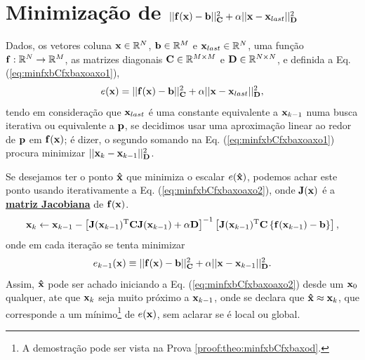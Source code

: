 \section{Minimização de $||\VECTOR{f}(\VECTOR{x})-\VECTOR{b}||_{\MATRIX{C}}^2+\alpha||\VECTOR{x}-\VECTOR{x}_{last}||_{\MATRIX{D}}^2$}



\begin{theorem}\label{theo:minfxbCfxbaxoaxo}
Dados,
os vetores coluna $\VECTOR{x}\in \mathbb{R}^N$, $\VECTOR{b}\in \mathbb{R}^M$ e $\VECTOR{x}_{last}\in \mathbb{R}^N$,  
uma função $\VECTOR{f}:\mathbb{R}^{N} \rightarrow \mathbb{R}^{M}$, 
as matrizes diagonais $\MATRIX{C} \in \mathbb{R}^{M\times M}$ e $\MATRIX{D} \in \mathbb{R}^{N\times N}$, e 
definida a Eq. (\ref{eq:minfxbCfxbaxoaxo1}),
\begin{equation}\label{eq:minfxbCfxbaxoaxo1}
e(\VECTOR{x})=||\VECTOR{f}(\VECTOR{x})-\VECTOR{b}||_{\MATRIX{C}}^2+\alpha||\VECTOR{x}-\VECTOR{x}_{last}||_{\MATRIX{D}}^2,
\end{equation}
tendo em consideração que $\VECTOR{x}_{last}$ é uma constante equivalente a $\VECTOR{x}_{k-1}$
numa busca iterativa ou equivalente a $\VECTOR{p}$, 
se decidimos usar uma aproximação linear ao redor de $\VECTOR{p}$ em $\VECTOR{f}(\VECTOR{x})$; 
é dizer, o segundo somando na Eq. (\ref{eq:minfxbCfxbaxoaxo1}) 
procura minimizar $||\VECTOR{x}_{k}-\VECTOR{x}_{k-1}||_{\MATRIX{D}}^2$.


Se desejamos ter o ponto $\VECTOR{\hat{x}}$ que minimiza o escalar $e(\VECTOR{\hat{x}})$,
podemos achar este ponto usando iterativamente a Eq. (\ref{eq:minfxbCfxbaxoaxo2}),
onde  $\MATRIX{J}(\VECTOR{x})$ é a \hyperref[def:jacobian]{\textbf{matriz Jacobiana}}  de $\VECTOR{f}(\VECTOR{x})$.
\begin{equation}\label{eq:minfxbCfxbaxoaxo2}
\VECTOR{x}_{k}\leftarrow \VECTOR{x}_{k-1}-
\left[ \MATRIX{J}(\VECTOR{x}_{k-1})^{\transpose}\MATRIX{C} \MATRIX{J}(\VECTOR{x}_{k-1}) +\alpha\MATRIX{D} \right]^{-1}
 \left[\MATRIX{J}(\VECTOR{x}_{k-1})^{\transpose}\MATRIX{C}\left\{\VECTOR{f}(\VECTOR{x}_{k-1})-\VECTOR{b}\right\}\right],
\end{equation}
onde em cada iteração se tenta minimizar
\begin{equation}\label{eq:minfxbCfxbaxoaxo2:ex}
e_{k-1}(\VECTOR{x})  \equiv 
||\VECTOR{f}(\VECTOR{x})-\VECTOR{b}||_{\MATRIX{C}}^2+
\alpha||\VECTOR{x}-\VECTOR{x}_{k-1}||_{\MATRIX{D}}^2.
\end{equation}
Assim, $\VECTOR{\hat{x}}$ pode ser achado 
iniciando a Eq. (\ref{eq:minfxbCfxbaxoaxo2}) desde um $\VECTOR{x}_{0}$ qualquer, 
ate que $\VECTOR{x}_{k}$ seja muito próximo a $\VECTOR{x}_{k-1}$,
onde se declara que $\VECTOR{\hat{x}} \approx \VECTOR{x}_{k}$,
que corresponde a um mínimo\footnote{\label{ref:minfxxp}A
demostração pode ser vista na Prova \ref{proof:theo:minfxbCfxbaxod}.} de $e(\VECTOR{x})$,
sem aclarar se é local ou global.



\end{theorem}
